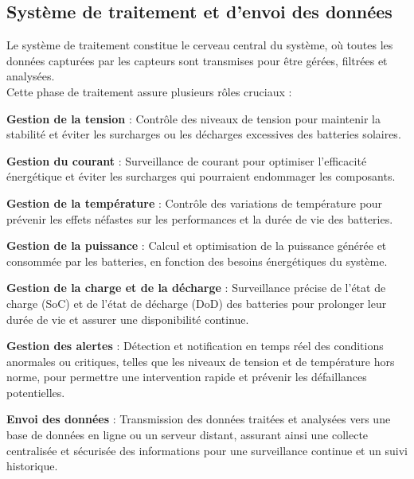\subsection*{Système de traitement et d'envoi des données}
Le système de traitement constitue le cerveau central du système, où toutes les données capturées par les capteurs sont transmises pour être gérées, filtrées et analysées.\\
Cette phase de traitement assure plusieurs rôles cruciaux :
\begin{filleditem}
	\item \textbf{Gestion de la tension} : Contrôle des niveaux de tension pour maintenir la stabilité et éviter les surcharges ou les décharges excessives des batteries solaires.
	
	\item	\textbf{Gestion du courant} : Surveillance de courant pour optimiser l'efficacité énergétique et éviter les surcharges qui pourraient endommager les composants.
	
	\item	\textbf{Gestion de la température} : Contrôle des variations de température pour prévenir les effets néfastes sur les performances et la durée de vie des batteries.
	
	\item	\textbf{Gestion de la puissance} : Calcul et optimisation de la puissance générée et consommée par les batteries, en fonction des besoins énergétiques du système.
	
	\item	\textbf{Gestion de la charge et de la décharge} : Surveillance précise de l'état de charge (SoC) et de l'état de décharge (DoD) des batteries pour prolonger leur durée de vie et assurer une disponibilité continue.
	
	\item	\textbf{Gestion des alertes} : Détection et notification en temps réel des conditions anormales ou critiques, telles que les niveaux de tension et de température hors norme, pour permettre une intervention rapide et prévenir les défaillances potentielles.
	
	\item	\textbf{Envoi des données} : Transmission des données traitées et analysées vers une base de données en ligne ou un serveur distant, assurant ainsi une collecte centralisée et sécurisée des informations pour une surveillance continue et un suivi historique. 
\end{filleditem}

